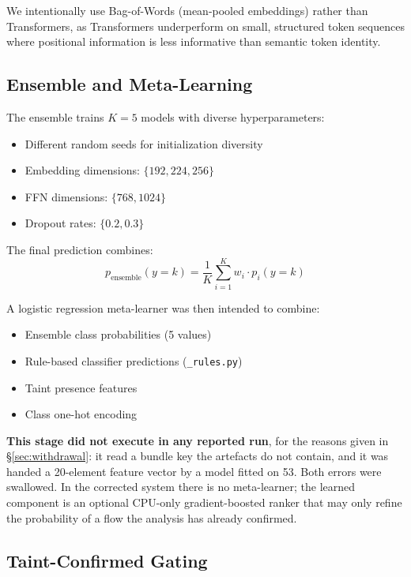 \documentclass[12pt,a4paper]{article}
\begin{document}
We intentionally use Bag-of-Words (mean-pooled embeddings) rather than Transformers, as Transformers underperform on small, structured token sequences where positional information is less informative than semantic token identity.

\subsection{Ensemble and Meta-Learning}
\label{sec:ensemble}

The ensemble trains $K=5$ models with diverse hyperparameters:
\begin{itemize}
    \item Different random seeds for initialization diversity
    \item Embedding dimensions: $\{192, 224, 256\}$
    \item FFN dimensions: $\{768, 1024\}$
    \item Dropout rates: $\{0.2, 0.3\}$
\end{itemize}

The final prediction combines:
\begin{equation}
p_{\text{ensemble}}(y=k) = \frac{1}{K} \sum_{i=1}^{K} w_i \cdot p_i(y=k)
\end{equation}

A logistic regression meta-learner was then intended to combine:
\begin{itemize}
    \item Ensemble class probabilities (5 values)
    \item Rule-based classifier predictions (\texttt{\_rules.py})
    \item Taint presence features
    \item Class one-hot encoding
\end{itemize}
\textbf{This stage did not execute in any reported run}, for the reasons given in
\S\ref{sec:withdrawal}: it read a bundle key the artefacts do not contain, and it
was handed a 20-element feature vector by a model fitted on 53. Both errors were
swallowed. In the corrected system there is no meta-learner; the learned
component is an optional CPU-only gradient-boosted ranker that may only refine
the probability of a flow the analysis has already confirmed.

\subsection{Taint-Confirmed Gating}
\label{sec:gating}
\end{document}
